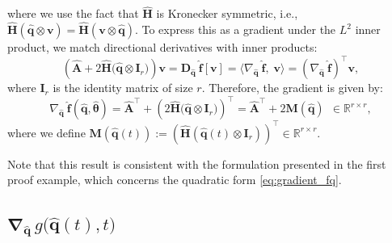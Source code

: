 where we use the fact that $\hat{\mathbf{H}}$ is Kronecker symmetric, i.e., $\hat{\mathbf{H}}(\hat{\mathbf{q}} \otimes \mathbf{v}) = \hat{\mathbf{H}}(\mathbf{v} \otimes \hat{\mathbf{q}})$.
To express this as a gradient under the $L^2$ inner product, we match directional derivatives with inner products:\\
$$
\left( \hat{\mathbf{A}} + 2\hat{\mathbf{H}}\bigl( \hat{\mathbf{q}} \otimes \mathbf{I}_r \bigr) \right) \mathbf{v} = \bm{D}_{\hat{\mathbf{q}}}~\hat{\mathbf{f}}[\mathbf{v}] = \langle \nabla_{\hat{\mathbf{q}}}~\hat{\mathbf{f}},\;\mathbf{v} \rangle = \left( \nabla_{\hat{\mathbf{q}}}~\hat{\mathbf{f}} \right)^{\top}  \mathbf{v},
$$
where $\mathbf{I}_r$ is the identity matrix of size $r$. Therefore, the gradient is given by:\\
\begin{equation}
    \nabla_{\hat{\mathbf{q}}}~\hat{\mathbf{f}}(\hat{\mathbf{q}}, \hat{\bm{\theta}}) = \hat{\mathbf{A}}^{\top} + \left( 2\hat{\mathbf{H}}\bigl( \hat{\mathbf{q}} \otimes \mathbf{I}_r \bigr) \right)^{\top} = \hat{\mathbf{A}}^{\top} + 2\mathbf{M}(\hat{\mathbf{q}}) ~~ \in \mathbb{R}^{r \times r},
    \label{eq:gradient_1}
\end{equation}
where we define $\mathbf{M}(\hat{\mathbf{q}}(t)) := \left( \hat{\mathbf{H}}( \hat{\mathbf{q}}(t) \otimes \mathbf{I}_r ) \right)^{\top} \in \mathbb{R}^{r \times r}$.

Note that this result is consistent with the formulation presented in the first proof example, which concerns the quadratic form \eqref{eq:gradient_fq}.


\subsection{$\bm{\nabla}_{\hat{\mathbf{q}}}\,g\bigl(\hat{\mathbf{q}}(t),t\bigr)$}

